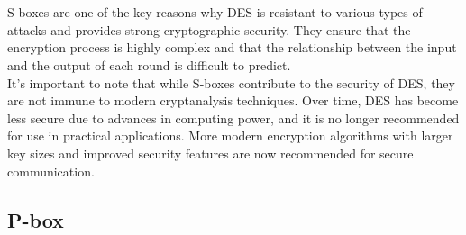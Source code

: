 \documentclass{report}
\begin{document}
\\
\\
S-boxes are one of the key reasons why DES is resistant to various types of attacks and provides strong cryptographic security. They ensure that the encryption process is highly complex and that the relationship between the input and the output of each round is difficult to predict.\\
It's important to note that while S-boxes contribute to the security of DES, they are not immune to modern cryptanalysis techniques. Over time, DES has become less secure due to advances in computing power, and it is no longer recommended for use in practical applications. More modern encryption algorithms with larger key sizes and improved security features are now recommended for secure communication.

\subsection{P-box}
\end{document}
